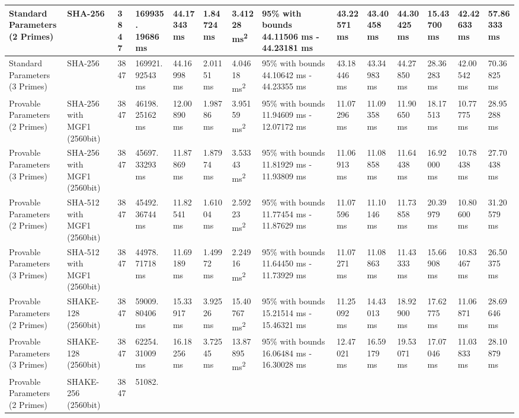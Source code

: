 \documentclass[]{final_report}
\theoremstyle{definition}
\begin{document}
\begin{landscape}
\begin{longtable}{|p{2.3cm}|p{1.8cm}|p{1.0cm}|p{1.7cm}|p{1.4cm}|p{1.5cm}|p{1.8cm}|p{1.5cm}|p{1.43cm}|p{1.5cm}|p{1.3cm}|p{1.4cm}|p{1.3cm}|p{1.3cm}|}
\hline
\endlastfoot
Standard Parameters (2 Primes) & SHA-256 & 3847 & 169935.
19686 ms & 44.17343 ms & 1.84724 ms & 3.41228 ms\textsuperscript{2} & 95\% with bounds 44.11506 ms - 44.23181 ms & 43.22571 ms & 43.40458 ms & 44.30425 ms & 15.43700 ms & 42.42633 ms & 57.86333 ms \\
\hline
Standard Parameters (3 Primes) & SHA-256 & 3847 & 169921.
92543 ms & 44.16998 ms & 2.01151 ms & 4.04618 ms\textsuperscript{2} & 95\% with bounds 44.10642 ms - 44.23355 ms & 43.18446 ms & 43.34983 ms & 44.27850 ms & 28.36283 ms & 42.00542 ms & 70.36825 ms \\
\hline
Provable Parameters (2 Primes) & SHA-256 with MGF1 (2560bit) & 3847 & 46198.
25162 ms & 12.00890 ms & 1.98786 ms & 3.95159 ms\textsuperscript{2} & 95\% with bounds 11.94609 ms - 12.07172 ms & 11.07296 ms & 11.09358 ms & 11.90650 ms & 18.17513 ms & 10.77775 ms & 28.95288 ms \\
\hline
Provable Parameters (3 Primes) & SHA-256 with MGF1 (2560bit) & 3847 & 45697.
33293 ms & 11.87869 ms & 1.87974 ms & 3.53343 ms\textsuperscript{2} & 95\% with bounds 11.81929 ms - 11.93809 ms & 11.06913 ms & 11.08858 ms & 11.64438 ms & 16.92000 ms & 10.78438 ms & 27.70438 ms \\
\hline
Provable Parameters (2 Primes) & SHA-512 with MGF1 (2560bit) & 3847 & 45492.
36744 ms & 11.82541 ms & 1.61004 ms & 2.59223 ms\textsuperscript{2} & 95\% with bounds 11.77454 ms - 11.87629 ms & 11.07596 ms & 11.10146 ms & 11.73858 ms & 20.39979 ms & 10.80600 ms & 31.20579 ms \\
\hline
Provable Parameters (3 Primes) & SHA-512 with MGF1 (2560bit) & 3847 & 44978.
71718 ms & 11.69189 ms & 1.49972 ms & 2.24916 ms\textsuperscript{2} & 95\% with bounds 11.64450 ms - 11.73929 ms & 11.07271 ms & 11.08863 ms & 11.43333 ms & 15.66908 ms & 10.83467 ms & 26.50375 ms \\
\hline
Provable Parameters (2 Primes) & SHAKE-128 (2560bit) & 3847 & 59009.
80406 ms & 15.33917 ms & 3.92526 ms & 15.40767 ms\textsuperscript{2} & 95\% with bounds 15.21514 ms - 15.46321 ms & 11.25092 ms & 14.43013 ms & 18.92900 ms & 17.62775 ms & 11.06871 ms & 28.69646 ms \\
\hline
Provable Parameters (3 Primes) & SHAKE-128 (2560bit) & 3847 & 62254.
31009 ms & 16.18256 ms & 3.72545 ms & 13.87895 ms\textsuperscript{2} & 95\% with bounds 16.06484 ms - 16.30028 ms & 12.47021 ms & 16.59179 ms & 19.53071 ms & 17.07046 ms & 11.03833 ms & 28.10879 ms \\
\hline
Provable Parameters (2 Primes) & SHAKE-256 (2560bit) & 3847 & 51082.

\end{longtable}
\end{landscape}
\end{document}
